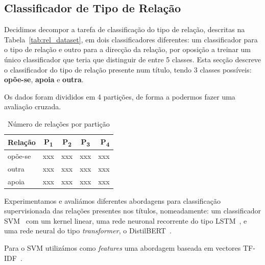 \documentclass[a4paper, twocolumn, 11pt, twoside]{article}
\begin{document}
\subsection{Classificador de Tipo de Relação}
\label{subsec:rel_classifier}

Decidimos decompor a tarefa de classificação do tipo de relação, descritas na Tabela~\ref{tab:rel_dataset}, em dois classificadores diferentes: um classificador para o tipo de relação e outro para a direcção da relação, por oposição a treinar um único classificador que teria que distinguir de entre 5 classes. Esta secção descreve o classificador do tipo de relação presente num título, tendo 3 classes possíveis: \textbf{opõe-se}, \textbf{apoia} e \textbf{outra}.

Os dados foram divididos em 4 partições, de forma a podermos fazer uma avaliação cruzada. 

\begin{table}[!h]
    \begin{center}
    \begin{tabular}{l cccr}
        {\bf Relação} & {\bf P\textsubscript{1}}&  {\bf P\textsubscript{2}}  & {\bf P\textsubscript{3}} & {\bf P\textsubscript{4}} \\
        \hline
        opõe-se          &  xxx  &  xxx  &  xxx  & xxx \\
        outra            &  xxx  &  xxx  &  xxx  & xxx \\
        apoia            &  xxx  &  xxx  &  xxx  & xxx \\
		\hline
    \end{tabular}
	\caption{Número de relações por partição}
	\end{center}
\end{table}


Experimentamos e avaliámos diferentes abordagens para classificação supervisionada das relações presentes nos títulos, nomeadamente: um classificador SVM~\citep{cortes1995support} com um kernel linear, uma rede neuronal recorrente do tipo LSTM~\citep{10.1162/neco.1997.9.8.1735}, e uma rede neural do tipo \textit{transformer}, o DistilBERT~\citep{9463516}.


Para o SVM utilizámos como \textit{features} uma abordagem baseada em vectores TF-IDF~\citep{DBLP:journals/ipm/SaltonB88}.
\end{document}
